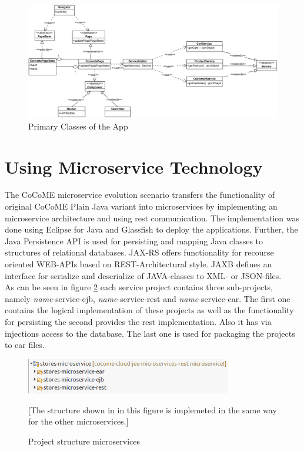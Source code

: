   
   \begin{figure}
  	\includegraphics[width=\textwidth]{img/appBasicClass.png}
  	\caption{Primary Classes of the App}
  	\label{App_ClassDiagram}
  \end{figure}

\FloatBarrier
 
 
 \section{Using Microservice Technology} \label{MicroserviceImplementation}
 The CoCoME microservice evolution scenario transfers the functionality of original CoCoME Plain Java variant into microservices by implementing an microservice architecture and using rest communication. The implementation was done using Eclipse for Java and Glassfish to deploy the applications. Further, the Java Persistence API is used for persisting and mapping Java classes to structures of relational databases. JAX-RS offers functionality for recourse oriented WEB-APIs based on REST-Architectural style. JAXB defines an interface for serialize and deserialize of JAVA-classes to XML- or JSON-files. 
 \\
 As can be seen in figure \ref{projectStructure} each service project contains three sub-projects, namely \textit{name}-service-ejb, \textit{name}-service-rest and \textit{name}-service-ear. The first one contains the logical implementation of these projects as well as the functionality for persisting the  second provides the rest implementation. Also it has via injections access to the database. The last one is used for packaging the projects to ear files. 
 
	\begin{figure}[h]
		\centering
		\includegraphics[width = 0.8\textwidth] {img/projectStructure_Micro.png}
	 	\caption{Project structure microservices}[The structure shown in in this figure is implemeted in the same way for the other microservices.]
	 	\label{projectStructure}
	 	
 	\end{figure}
 	
